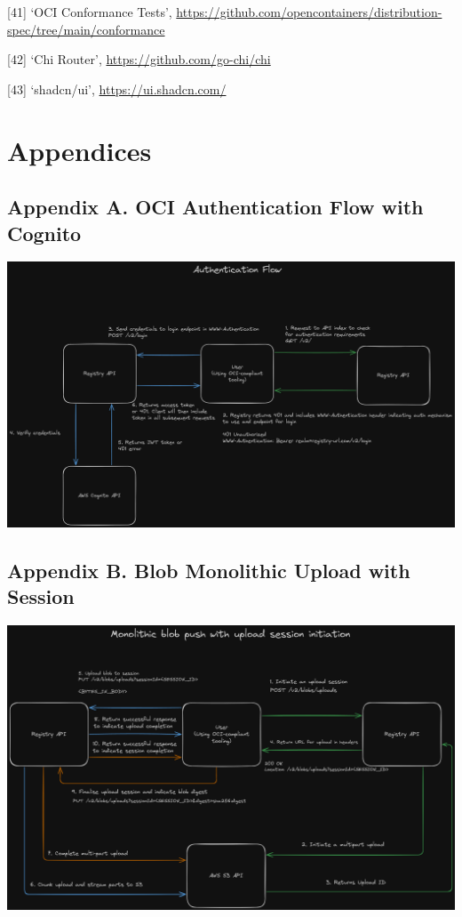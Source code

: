 \documentclass{article}
\begin{document}
  [41] `OCI Conformance Tests', \url{https://github.com/opencontainers/distribution-spec/tree/main/conformance}

  [42] `Chi Router', \url{https://github.com/go-chi/chi}

  [43] `shadcn/ui', \url{https://ui.shadcn.com/}

  \section{Appendices}

  \subsection{Appendix A. OCI Authentication Flow with Cognito}
  \label{sec:appendix-a}

  \includegraphics[scale=0.25]{appendix/auth-flow.png}

  \subsection{Appendix B. Blob Monolithic Upload with Session}
  \label{sec:appendix-b}

  \includegraphics[scale=0.25]{appendix/blob-monolithic-upload-with-session.png}
\end{document}
